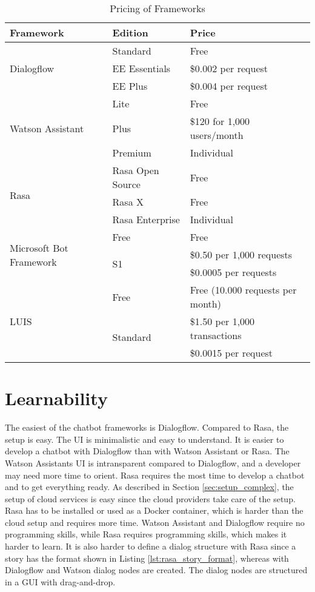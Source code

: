 \begin{table}[H]
    \centering
    \begin{tabular}{ l | l | l }
        Framework & Edition & Price \\ \hline \hline
        \multirow{3}{*}{Dialogflow} & Standard & Free \\
        & EE Essentials &  \$0.002 per request\\
        & EE Plus & \$0.004 per request \\ \hline

        \multirow{3}{*}{Watson Assistant} & Lite & Free \\
        & Plus &  \$120 for 1,000 users/month\\
        & Premium & Individual \\ \hline

        \multirow{3}{*}{Rasa} & Rasa Open Source & Free \\
        & Rasa X &  Free\\
        & Rasa Enterprise & Individual \\ \hline

        
        \multirow{3}{*}{Microsoft Bot Framework} & Free  & Free \\
        & \multirow{2}{*}{S1} & \$0.50 per 1,000 requests \\ 
        & & \$0.0005 per requests \\ \hline
                
        \multirow{3}{*}{LUIS} & Free  & Free (10.000 requests per month) \\
        & \multirow{2}{*}{Standard} &  \$1.50 per 1,000 transactions\\
        & &  \$0.0015 per request
    \end{tabular}
    \caption{Pricing of Frameworks \cite{rasa, dialogflow, watsonassistant,luisdocs}} \label{tab:pricing}
\end{table} \noindent


\section*{Learnability}
The easiest of the chatbot frameworks is Dialogflow.
Compared to Rasa, the setup is easy.
The UI is minimalistic and easy to understand.
It is easier to develop a chatbot with Dialogflow than with Watson Assistant or Rasa.
The Watson Assistants UI is intransparent compared to Dialogflow, and a developer may need more time to orient.
Rasa requires the most time to develop a chatbot and to get everything ready.
As described in Section \ref{sec:setup_complex}, the setup of cloud services is easy since the cloud providers take care of the setup.
Rasa has to be installed or used as a Docker container, which is harder than the cloud setup and requires more time.
Watson Assistant and Dialogflow require no programming skills, while Rasa requires programming skills, which makes it harder to learn.
It is also harder to define a dialog structure with Rasa since a story has the format shown in Listing \ref{lst:rasa_story_format}, whereas with Dialogflow and Watson dialog nodes are created.
The dialog nodes are structured in a GUI with drag-and-drop.

